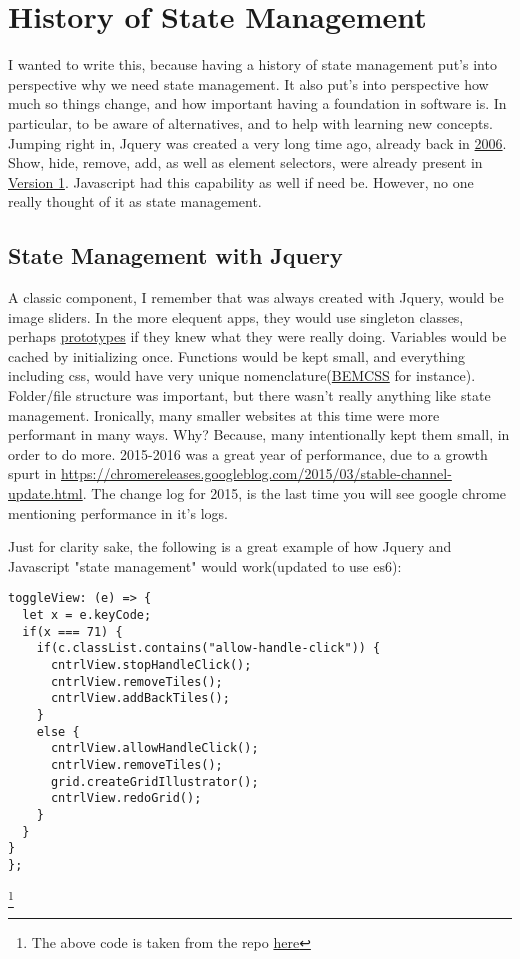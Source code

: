 \maketitle{}
\section{ History of State Management }

I wanted to write this, because having a history of state management put's into
perspective why we need state management. It also put's into perspective how
much so things change, and how important having a foundation in software is.
In particular, to be aware of alternatives, and to help with learning new
concepts. Jumping right in, Jquery was created a very long time ago, already
back in \href{https://en.wikipedia.org/wiki/JQuery}{2006}. Show, hide, remove,
add, as well as element selectors, were already present in
\href{http://api.jquery.com/category/version/1.0/}{Version 1}. Javascript had
this capability as well if need be. However, no one really thought of it as
state management.

\subsection{ State Management with Jquery }
A classic component, I remember that was always created with Jquery, would be
image sliders. In the more elequent apps, they would use singleton classes,
perhaps \href{https://www.w3schools.com/js/js\_object\_prototypes.asp}{prototypes}
if they knew what they were really doing. Variables would be cached by
initializing once. Functions would be kept small, and everything including css,
would have very unique nomenclature(\href{http://getbem.com/introduction/}{BEMCSS}
for instance). Folder/file structure was important, but there wasn't really
anything like state management. Ironically, many smaller websites at this time
were more performant in many ways. Why? Because, many intentionally kept them
small, in order to do more. 2015-2016 was a great year of performance, due to a
growth spurt in \href{browser capabilities}{https://chromereleases.googleblog.com/2015/03/stable-channel-update.html}.
The change log for 2015, is the last time you will see google chrome mentioning
performance in it's logs.

Just for clarity sake, the following is a great example of how Jquery and
Javascript "state management" would work(updated to use es6):

\begin{lstlisting}
toggleView: (e) => {
  let x = e.keyCode;
  if(x === 71) {
    if(c.classList.contains("allow-handle-click")) {
      cntrlView.stopHandleClick();
      cntrlView.removeTiles();
      cntrlView.addBackTiles();
    }
    else {
      cntrlView.allowHandleClick();
      cntrlView.removeTiles();
      grid.createGridIllustrator();
      cntrlView.redoGrid();
    }
  }
}
};
\end{lstlisting}
\footnote{The above code is taken from the repo \href{https://github.com/CharlieGreenman/codeIllustrator/blob/master/app/js/\_control\-view.js}{here}}
